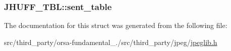 \subsubsection[{sent\+\_\+table}]{ J\+H\+U\+F\+F\+\_\+\+T\+B\+L\+::sent\+\_\+table}\label{structJHUFF__TBL_a387c655e83d0d57c50802856d630f37b}


The documentation for this struct was generated from the following file\+:\begin{DoxyCompactItemize}
\item 
src/third\+\_\+party/orsa-\/fundamental\+\_./src/third\+\_\+party/jpeg/\hyperlink{jpeglib_8h}{jpeglib.\+h}\end{DoxyCompactItemize}
